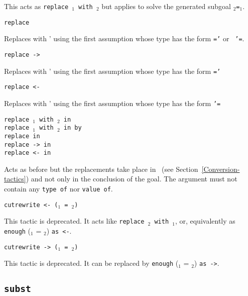 \begin{coq_example*}
\begin{Variants}
  This acts as {\tt replace \term$_1$ with \term$_2$} but applies {\tt \tac}
  to solve the generated subgoal {\tt \term$_2$=\term$_1$}.

\item {\tt replace {\term}}

  Replaces {\term} with {\term'} using the
  first assumption whose type has the form {\tt \term=\term'} or {\tt
    \term'=\term}.

\item {\tt replace -> {\term}}

  Replaces {\term} with {\term'} using the
  first assumption whose type has the form {\tt \term=\term'}

\item {\tt replace <- {\term}}

  Replaces {\term} with {\term'} using the
  first assumption whose type has the form {\tt \term'=\term}

\item {\tt replace {\term$_1$} with {\term$_2$} in  }\\
    {\tt replace {\term$_1$} with {\term$_2$} in  by \tac }\\
    {\tt replace {\term} in }\\
    {\tt replace -> {\term} in }\\
    {\tt replace <- {\term} in }

    Acts as before but the replacements take place in
    ~(see Section~\ref{Conversion-tactics}) and not only
    in the conclusion of the goal.
    The  argument must not contain any \texttt{type of} nor \texttt{value of}.

\item {\tt cutrewrite <- (\term$_1$ = \term$_2$)}

This tactic is deprecated. It acts like {\tt replace {\term$_2$} with
  {\term$_1$}}, or, equivalently as {\tt enough} (\term$_1$ =
\term$_2$) {\tt as <-}.

\item {\tt cutrewrite -> (\term$_1$ = \term$_2$)}

This tactic is deprecated. It can be replaced by {\tt enough}
(\term$_1$ = \term$_2$) {\tt as ->}.

\end{Variants}

\subsection{\tt subst \ident}


\end{coq_example*}
